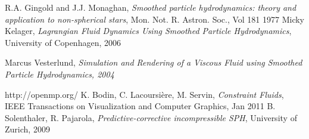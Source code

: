 \documentclass[a4paper,12pt,oneside,final]{extarticle}
\begin{document}
\begin{thebibliography}{9}
  
  R.A. Gingold and J.J. Monaghan, \emph{Smoothed particle hydrodynamics: theory and application to non-spherical stars}, Mon. Not. R. Astron. Soc., Vol 181 1977
  Micky Kelager, \emph{Lagrangian Fluid Dynamics Using Smoothed Particle Hydrodynamics}, University of Copenhagen, 2006

  Marcus Vesterlund, \emph{Simulation and Rendering of a Viscous Fluid using Smoothed Particle Hydrodynamics, 2004}
  
  http://openmp.org/
   K. Bodin, C. Lacoursière, M. Servin, \emph{Constraint Fluids}, IEEE Transactions on Visualization and Computer Graphics, Jan 2011 
    B. Solenthaler, R. Pajarola, \emph{Predictive-corrective incompressible SPH}, University of Zurich, 2009
\end{thebibliography}
\end{document}
